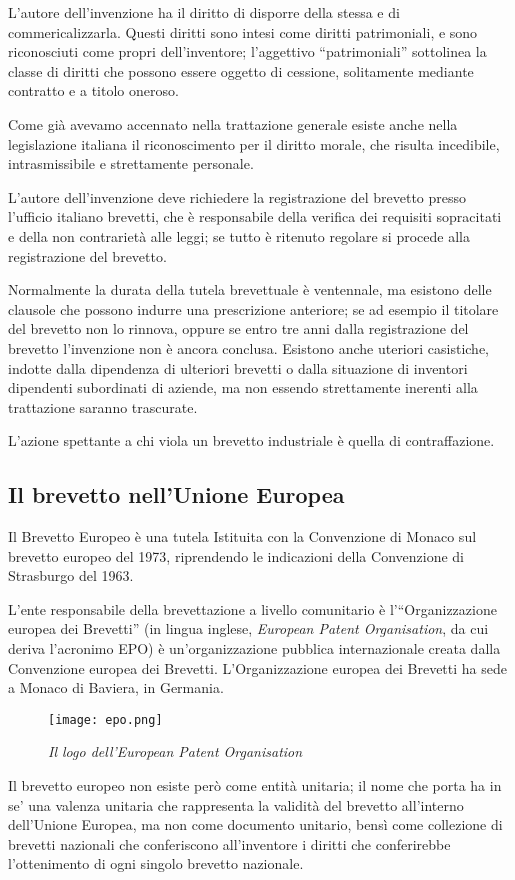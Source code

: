 L'autore dell'invenzione ha il diritto di disporre della stessa e di commericalizzarla. Questi diritti sono intesi come diritti patrimoniali, e sono riconosciuti come propri dell'inventore; l'aggettivo ``patrimoniali'' sottolinea la classe di diritti che possono essere oggetto di cessione, solitamente mediante contratto e a titolo oneroso.

Come già avevamo accennato nella trattazione generale esiste anche nella legislazione italiana il riconoscimento per il diritto morale, che risulta incedibile, intrasmissibile e strettamente personale.

L'autore dell'invenzione deve richiedere la registrazione del brevetto presso l'ufficio italiano brevetti, che è responsabile della verifica dei requisiti sopracitati e della non contrarietà alle leggi; se tutto è ritenuto regolare si procede alla registrazione del brevetto.

Normalmente la durata della tutela brevettuale è ventennale, ma esistono delle clausole che possono indurre una prescrizione anteriore; se ad esempio il titolare del brevetto non lo rinnova, oppure se entro tre anni dalla registrazione del brevetto l'invenzione non è ancora conclusa. Esistono anche uteriori casistiche, indotte dalla dipendenza di ulteriori brevetti o dalla situazione di inventori dipendenti subordinati di aziende, ma non essendo strettamente inerenti alla trattazione saranno trascurate.

L'azione spettante a chi viola un brevetto industriale è quella di contraffazione.

\subsection{Il brevetto nell'Unione Europea}
Il Brevetto Europeo è una tutela Istituita con la Convenzione di Monaco sul brevetto europeo del 1973, riprendendo le indicazioni della Convenzione di Strasburgo del 1963.

L'ente responsabile della brevettazione a livello comunitario è l'``Organizzazione europea dei Brevetti'' (in lingua inglese, \textit{European Patent Organisation}, da cui deriva l'acronimo EPO) è un'organizzazione pubblica internazionale creata dalla Convenzione europea dei Brevetti. L'Organizzazione europea dei Brevetti ha sede a Monaco di Baviera, in Germania.
\begin{figure}[hb]
\centering
	\texttt{[image: epo.png]}
\caption{\textit{Il logo dell'European Patent Organisation}}
\end{figure}
Il brevetto europeo non esiste però come entità unitaria; il nome che porta ha in se' una valenza unitaria che rappresenta la validità del brevetto all'interno dell'Unione Europea, ma non come documento unitario, bensì come collezione di brevetti nazionali che conferiscono all'inventore i diritti che conferirebbe l'ottenimento di ogni singolo brevetto nazionale.

